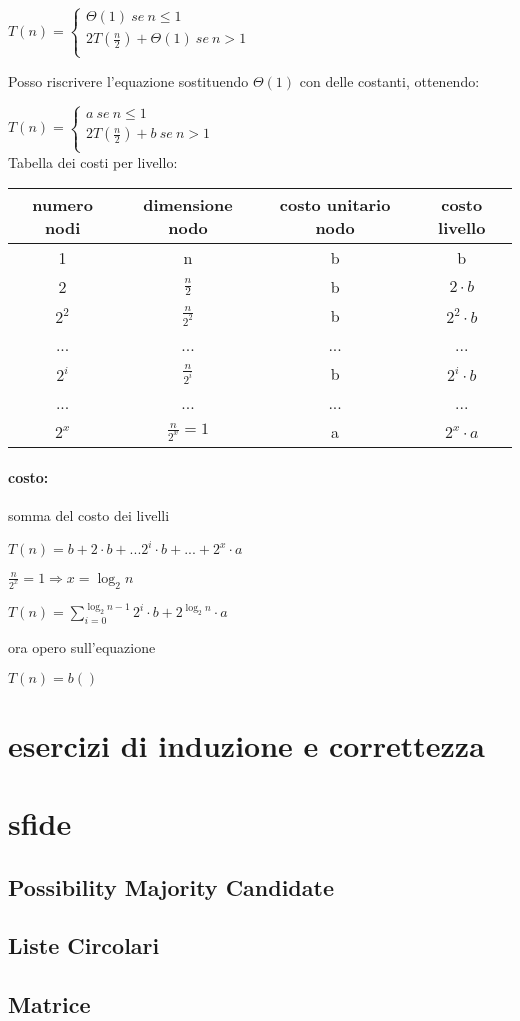 \documentclass{article}
\begin{document}
$T(n)= \begin{cases}
    \Theta(1) \ se \ n \leq 1\\
    2T(\frac{n}{2}) + \Theta(1) \ se \ n > 1\\
\end{cases}$

Posso riscrivere l'equazione sostituendo $\Theta(1)$ con delle costanti, ottenendo:

$T(n)= \begin{cases}
    a \ se \ n \leq 1\\
    2T(\frac{n}{2}) + b \ se \ n > 1\\
\end{cases}$
\\
Tabella dei costi per livello:\\
\begin{tabular}{|c|c|c|c|}
    \hline
    numero nodi & dimensione nodo & costo unitario nodo & costo livello\\
    \hline
    1 & n & b & b\\
    2 & $\frac{n}{2}$ & b & $2 \cdot b$\\
    $2^2$ & $\frac{n}{2^2}$ & b & $2^2 \cdot b$\\
    ... & ... & ... & ...\\
    $2^i$ & $\frac{n}{2^i}$ & b & $2^i \cdot b$\\
    ... & ... & ... & ...\\
    $2^x$ & $\frac{n}{2^x}=1$ & a & $2^x \cdot a$\\
    \hline
\end{tabular}

\paragraph{costo:} somma del costo dei livelli 


$\displaystyle T(n) = b + 2 \cdot b + ... 2^i \cdot b + ... + 2^x \cdot a $

$\displaystyle \frac{n}{2^x} = 1 \Rightarrow x = \log_2 n$

$T(n) = \displaystyle \sum_{i=0}^{\log_2 n-1}2^i \cdot b + 2^{\log_2 n} \cdot a$

ora opero sull'equazione 


$T(n)= b ()$

\section{esercizi di induzione e correttezza}
\section{sfide}
\subsection{Possibility Majority Candidate}
\subsection{Liste Circolari}
\subsection{Matrice}
\end{document}
